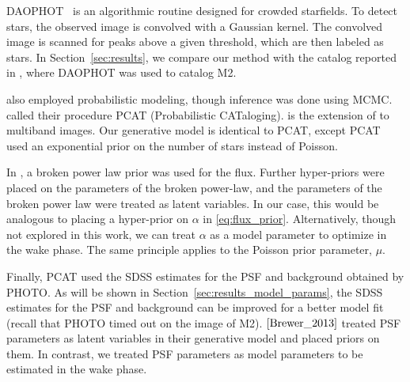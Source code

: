 DAOPHOT~\cite{stetson2987daophot} is an algorithmic routine designed for crowded starfields. To detect stars, the observed image is convolved with a Gaussian kernel. The convolved image is scanned for peaks above a given threshold, which are then labeled as stars. In Section~\ref{sec:results}, we compare our method with the catalog reported in \cite{An_2008_m2}, where DAOPHOT was used to catalog M2. 

\cite{Brewer_2013, Portillo_2017, Feder_2019} also employed probabilistic modeling, though inference was done using MCMC. \cite{Portillo_2017, Feder_2019} called their procedure PCAT (Probabilistic CATaloging). \cite{Feder_2019} is the extension 
of \cite{Portillo_2017} to multiband images. Our generative model is identical to PCAT, except PCAT used an exponential prior on the number of stars instead of Poisson. 

In \cite{Brewer_2013}, a broken power law prior was used for the flux. 
Further hyper-priors were placed on the parameters of the broken power-law, and the parameters of the broken power law were treated as latent variables. In our case, this would be analogous to placing a hyper-prior on $\alpha$ in \eqref{eq:flux_prior}. Alternatively, though not explored in this work, we can treat $\alpha$ as a model parameter to optimize in the wake phase. The same principle applies to the Poisson prior parameter, $\mu$. 

Finally, PCAT used the SDSS estimates for the PSF and background obtained by PHOTO.
As will be shown in Section~\ref{sec:results_model_params}, the SDSS estimates for the PSF and background can be improved for a better model fit (recall that PHOTO timed out 
on the image of M2). $\cite{Brewer_2013}$ treated PSF parameters as latent variables in their generative model and placed priors on them. In contrast, we treated PSF parameters as model parameters to be estimated in the wake phase. 

